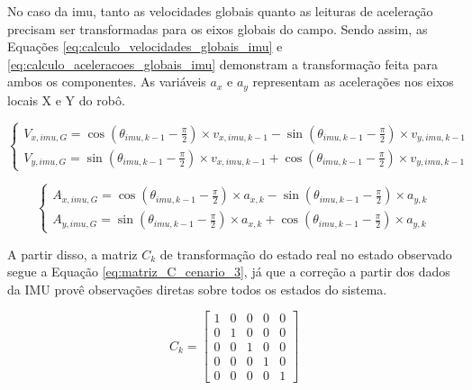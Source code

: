 \documentclass[acronym, symbols, table, deposito]{fei}
\begin{document}
			No caso da \acrshort{imu}, tanto as velocidades globais quanto as leituras de aceleração precisam ser transformadas para os eixos globais do campo. Sendo assim, as Equações \eqref{eq:calculo_velocidades_globais_imu} e \eqref{eq:calculo_aceleracoes_globais_imu} demonstram a transformação feita para ambos os componentes. As variáveis $a_{x}$ e $a_{y}$ representam as acelerações nos eixos locais X e Y do robô.
		
			\begin{equation}\label{eq:calculo_velocidades_globais_imu}
				\begin{cases}
					V_{x,imu,G} = \cos(\theta_{imu,k-1} - \frac{\pi}{2}) \times v_{x,imu,k-1} - \sin(\theta_{imu,k-1} - \frac{\pi}{2}) \times v_{y,imu,k-1} \\
					V_{y,imu,G} = \sin(\theta_{imu,k-1} - \frac{\pi}{2}) \times v_{x,imu,k-1} + \cos(\theta_{imu,k-1} - \frac{\pi}{2}) \times v_{y,imu,k-1}
				\end{cases}
			\end{equation}
		
			\begin{equation}\label{eq:calculo_aceleracoes_globais_imu}
				\begin{cases}
					A_{x,imu,G} = \cos(\theta_{imu,k-1} - \frac{\pi}{2}) \times a_{x,k} - \sin(\theta_{imu,k-1} - \frac{\pi}{2}) \times a_{y,k} \\
					A_{y,imu,G} = \sin(\theta_{imu,k-1} - \frac{\pi}{2}) \times a_{x,k} + \cos(\theta_{imu,k-1} - \frac{\pi}{2}) \times a_{y,k}
				\end{cases}
			\end{equation}
		
			A partir disso, a matriz $C_k$ de transformação do estado real no estado observado segue a Equação \eqref{eq:matriz_C_cenario_3}, já que a correção a partir dos dados da IMU provê observações diretas sobre todos os estados do sistema.
			
			\begin{equation}\label{eq:matriz_C_cenario_3}
				C_{k} = \begin{bmatrix}
					1 & 0 & 0 & 0 & 0 \\
					0 & 1 & 0 & 0 & 0 \\
					0 & 0 & 1 & 0 & 0 \\
					0 & 0 & 0 & 1 & 0 \\
					0 & 0 & 0 & 0 & 1
				\end{bmatrix}
			\end{equation}
		
\end{document}

